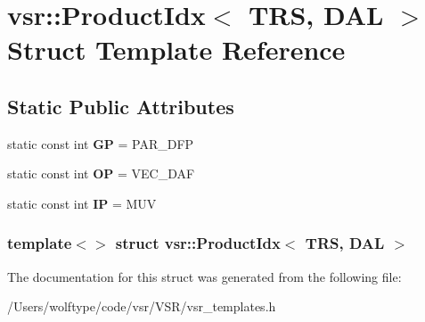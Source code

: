 \hypertarget{structvsr_1_1_product_idx_3_01_t_r_s_00_01_d_a_l_01_4}{\section{vsr\-:\-:Product\-Idx$<$ T\-R\-S, D\-A\-L $>$ Struct Template Reference}
\label{structvsr_1_1_product_idx_3_01_t_r_s_00_01_d_a_l_01_4}
}
\subsection*{Static Public Attributes}
\begin{DoxyCompactItemize}
\item 
\hypertarget{structvsr_1_1_product_idx_3_01_t_r_s_00_01_d_a_l_01_4_a08e62b4b0aa22230a438de40d5fc3369}{static const int {\bfseries G\-P} = P\-A\-R\-\_\-\-D\-F\-P}\label{structvsr_1_1_product_idx_3_01_t_r_s_00_01_d_a_l_01_4_a08e62b4b0aa22230a438de40d5fc3369}

\item 
\hypertarget{structvsr_1_1_product_idx_3_01_t_r_s_00_01_d_a_l_01_4_ac2d1678b7ac5c072fb256816311996c2}{static const int {\bfseries O\-P} = V\-E\-C\-\_\-\-D\-A\-F}\label{structvsr_1_1_product_idx_3_01_t_r_s_00_01_d_a_l_01_4_ac2d1678b7ac5c072fb256816311996c2}

\item 
\hypertarget{structvsr_1_1_product_idx_3_01_t_r_s_00_01_d_a_l_01_4_ad68e6a8e54600cef9394993f0b4fa966}{static const int {\bfseries I\-P} = M\-U\-V}\label{structvsr_1_1_product_idx_3_01_t_r_s_00_01_d_a_l_01_4_ad68e6a8e54600cef9394993f0b4fa966}

\end{DoxyCompactItemize}
\subsubsection*{template$<$$>$ struct vsr\-::\-Product\-Idx$<$ T\-R\-S, D\-A\-L $>$}



The documentation for this struct was generated from the following file\-:\begin{DoxyCompactItemize}
\item 
/\-Users/wolftype/code/vsr/\-V\-S\-R/vsr\-\_\-templates.\-h\end{DoxyCompactItemize}
